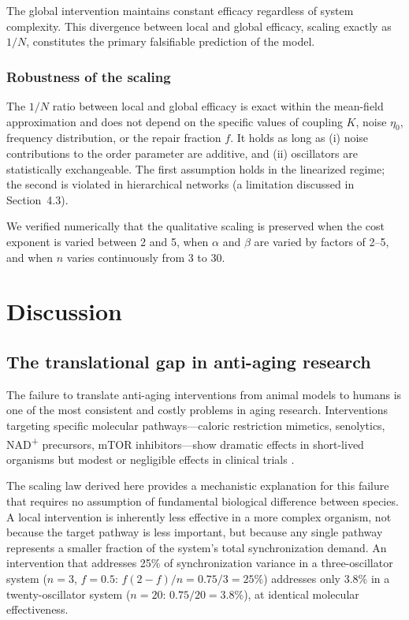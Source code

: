 \documentclass[12pt]{article}
\begin{document}
The global intervention maintains constant efficacy regardless of system
complexity. This divergence between local and global efficacy, scaling exactly
as $1/N$, constitutes the primary falsifiable prediction of the model.

\subsubsection*{Robustness of the scaling}

The $1/N$ ratio between local and global efficacy is exact within the
mean-field approximation and does not depend on the specific values of coupling
$K$, noise $\eta_0$, frequency distribution, or the repair fraction $f$. It
holds as long as (i) noise contributions to the order parameter are additive,
and (ii) oscillators are statistically exchangeable. The first assumption holds
in the linearized regime; the second is violated in hierarchical networks
(a limitation discussed in Section~4.3).

We verified numerically that the qualitative scaling is preserved when the cost
exponent is varied between 2 and 5, when $\alpha$ and $\beta$ are varied by
factors of 2--5, and when $n$ varies continuously from 3 to 30.

\section{Discussion}

\subsection{The translational gap in anti-aging research}

The failure to translate anti-aging interventions from animal models to humans is
one of the most consistent and costly problems in aging research. Interventions
targeting specific molecular pathways---caloric restriction mimetics, senolytics,
NAD\textsuperscript{+} precursors, mTOR inhibitors---show dramatic effects in
short-lived organisms but modest or negligible effects in clinical trials
\citep{barzilai2018}.

The scaling law derived here provides a mechanistic explanation for this failure
that requires no assumption of fundamental biological difference between species.
A local intervention is inherently less effective in a more complex organism, not
because the target pathway is less important, but because any single pathway
represents a smaller fraction of the system's total synchronization demand. An
intervention that addresses 25\% of synchronization variance in a
three-oscillator system ($n{=}3$, $f{=}0.5$: $f(2{-}f)/n = 0.75/3 = 25\%$)
addresses only 3.8\% in a twenty-oscillator system ($n{=}20$: $0.75/20 = 3.8\%$),
at
identical molecular effectiveness.
\end{document}
